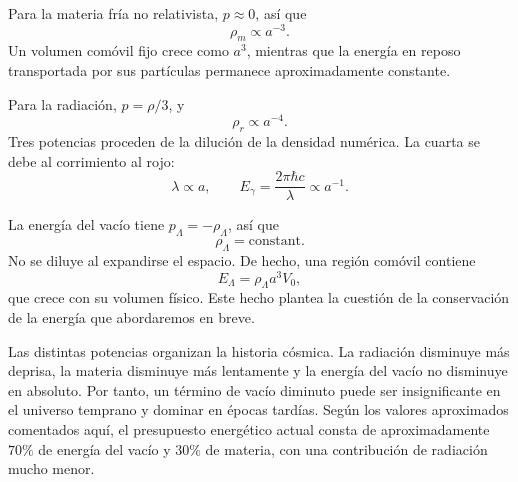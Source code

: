Para la materia fría no relativista, \(p\approx0\), así que
\begin{equation}
\rho_m\propto a^{-3}.
\end{equation}
Un volumen comóvil fijo crece como \(a^3\), mientras que la energía en reposo transportada por sus partículas permanece aproximadamente constante.

Para la radiación, \(p=\rho/3\), y
\begin{equation}
\rho_r\propto a^{-4}.
\end{equation}
Tres potencias proceden de la dilución de la densidad numérica. La cuarta se debe al corrimiento al rojo:
\begin{equation}
\lambda\propto a,
\qquad
E_\gamma=\frac{2\pi\hbar c}{\lambda}\propto a^{-1}.
\end{equation}

\begin{classroomqa}
\end{classroomqa}

La energía del vacío tiene \(p_\Lambda=-\rho_\Lambda\), así que
\begin{equation}
\rho_\Lambda=\text{constant}.
\end{equation}
No se diluye al expandirse el espacio. De hecho, una región comóvil contiene
\begin{equation}
E_\Lambda=\rho_\Lambda a^3V_0,
\end{equation}
que crece con su volumen físico. Este hecho plantea la cuestión de la conservación de la energía que abordaremos en breve.

Las distintas potencias organizan la historia cósmica. La radiación disminuye más deprisa, la materia disminuye más lentamente y la energía del vacío no disminuye en absoluto. Por tanto, un término de vacío diminuto puede ser insignificante en el universo temprano y dominar en épocas tardías. Según los valores aproximados comentados aquí, el presupuesto energético actual consta de aproximadamente \(70\%\) de energía del vacío y \(30\%\) de materia, con una contribución de radiación mucho menor.

